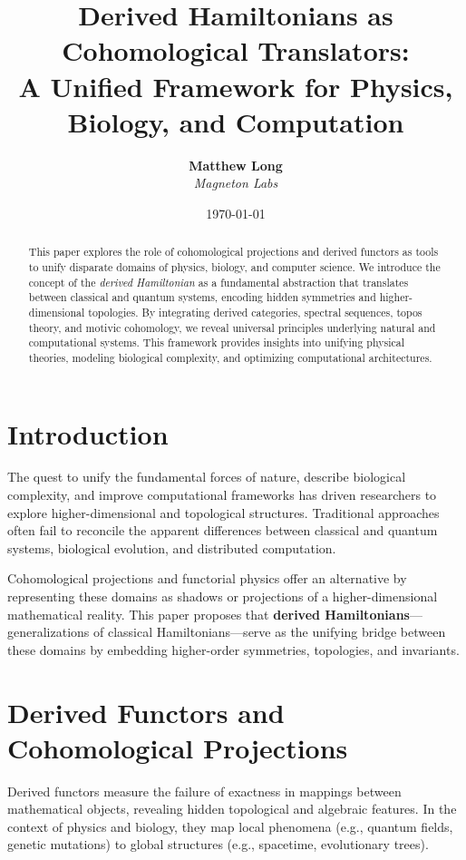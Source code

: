 \documentclass{article}
\title{\textbf{Derived Hamiltonians as Cohomological Translators:}\\
\large{A Unified Framework for Physics, Biology, and Computation}}
\author{
  \textbf{Matthew Long}\\
  \textit{Magneton Labs}
}
\date{\today}
\begin{document}
\maketitle

\begin{abstract}
This paper explores the role of cohomological projections and derived functors as tools to unify disparate domains of physics, biology, and computer science. We introduce the concept of the \textit{derived Hamiltonian} as a fundamental abstraction that translates between classical and quantum systems, encoding hidden symmetries and higher-dimensional topologies. By integrating derived categories, spectral sequences, topos theory, and motivic cohomology, we reveal universal principles underlying natural and computational systems. This framework provides insights into unifying physical theories, modeling biological complexity, and optimizing computational architectures.
\end{abstract}

\section{Introduction}
The quest to unify the fundamental forces of nature, describe biological complexity, and improve computational frameworks has driven researchers to explore higher-dimensional and topological structures. Traditional approaches often fail to reconcile the apparent differences between classical and quantum systems, biological evolution, and distributed computation.

Cohomological projections and functorial physics offer an alternative by representing these domains as shadows or projections of a higher-dimensional mathematical reality. This paper proposes that \textbf{derived Hamiltonians}—generalizations of classical Hamiltonians—serve as the unifying bridge between these domains by embedding higher-order symmetries, topologies, and invariants.

\section{Derived Functors and Cohomological Projections}
Derived functors measure the failure of exactness in mappings between mathematical objects, revealing hidden topological and algebraic features. In the context of physics and biology, they map local phenomena (e.g., quantum fields, genetic mutations) to global structures (e.g., spacetime, evolutionary trees).
\end{document}

